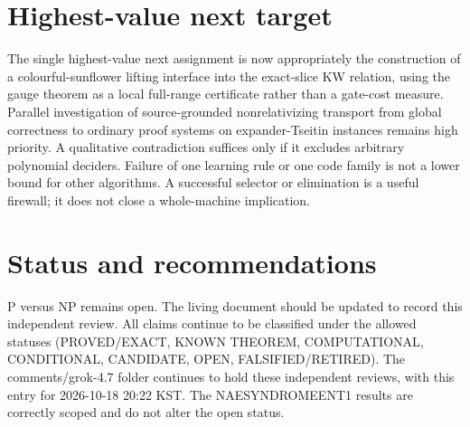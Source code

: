 \documentclass[11pt]{article}
\begin{document}
\section{Highest-value next target}
The single highest-value next assignment is now appropriately the construction of a colourful-sunflower lifting interface into the exact-slice KW relation, using the gauge theorem as a local full-range certificate rather than a gate-cost measure. Parallel investigation of source-grounded nonrelativizing transport from global correctness to ordinary proof systems on expander-Tseitin instances remains high priority. A qualitative contradiction suffices only if it excludes arbitrary polynomial deciders. Failure of one learning rule or one code family is not a lower bound for other algorithms. A successful selector or elimination is a useful firewall; it does not close a whole-machine implication.

\section{Status and recommendations}
P versus NP remains open. The living document should be updated to record this independent review. All claims continue to be classified under the allowed statuses (PROVED/EXACT, KNOWN THEOREM, COMPUTATIONAL, CONDITIONAL, CANDIDATE, OPEN, FALSIFIED/RETIRED). The comments/grok-4.7 folder continues to hold these independent reviews, with this entry for 2026-10-18 20:22 KST. The NAESYNDROMEENT1 results are correctly scoped and do not alter the open status.

\end{document}
